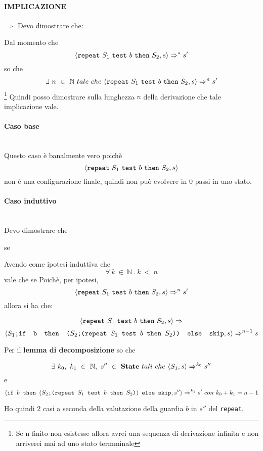 {	\paragraph{IMPLICAZIONE} \textbf{\Large{$\Longrightarrow$ }} 
	Devo dimostrare che:
	\begin{center}
	\exThreeLtR{}
	\end{center}
	
	Dal momento che 
	\[ \langle{}\texttt{repeat}~S_1~\texttt{test}~b~\texttt{then}~S_2, s\rangle{}\Rightarrow^{*}s' \]
	 so che
	\[ \exists{}~n~\in~\mathbb{N}~tale~che~
	\langle{}\texttt{repeat}~S_1~\texttt{test}~b~\texttt{then}~S_2, s\rangle{}\Rightarrow^{n}s' \]\footnote{Se n finito non esistesse allora avrei una sequenza di derivazione infinita e non arriverei mai ad uno stato termminale }
	Quindi posso dimostrare sulla
	lunghezza $n$ della derivazione che tale implicazione vale.\\
	\paragraph{Caso base}
	
	 \\
	Questo caso è banalmente vero poichè 
\[ \langle{}\texttt{repeat}~S_1~\texttt{test}~b~\texttt{then}~S_2, s\rangle{} \]
	non è una configurazione finale,
	quindi non può evolvere in 0 passi in uno stato.
	
	\paragraph{Caso induttivo} 
	
	 \\
	 Devo dimostrare che 
	\begin{center}
	se 
	\end{center}
	Avendo come ipotesi induttiva che 
	\[ \forall{}~k~\in~\mathbb{N}~.~k~<~n  \]vale che se 
	Poichè, per ipotesi, \[ \langle{}\texttt{repeat}~S_1~\texttt{test}~b~\texttt{then}~S_2, s\rangle{}\Rightarrow^{n}s' \] allora
	si ha che:

\[ 	\langle{}\texttt{repeat}~S_1~\texttt{test}~b~\texttt{then}~S_2, s\rangle{}\Rightarrow^{}   \]
\[	\langle{}\textrm{\normalfont{\texttt{$S_1$;\mbox{\normalfont{\texttt{if }}} b \textrm{\normalfont{\texttt{ then }}} (\textrm{\normalfont{\texttt{$S_2$;(\texttt{repeat}~$S_1$~\texttt{test}~$b$~\texttt{then}~$S_2$)}}}) \textrm{\normalfont{\texttt{ else }}} \textrm{\normalfont{\texttt{skip}}}}}}, s\rangle{}\Rightarrow^{n-1}s \]

	Per il \textbf{lemma di decomposizione} so che 

\[ 	\exists{}~k_0,~k_1~\in~
	\mathbb{N},~s''~\in~\mbox{\textbf{State}}{}~tali~che~\langle{}S_1, s\rangle{}\Rightarrow^{k_0}s'' \] e 
\[ 	\langle{}\mbox{\normalfont{\texttt{if }}} b \textrm{\normalfont{\texttt{ then }}} (\textrm{\normalfont{\texttt{$S_2$;(\texttt{repeat}~$S_1$~\texttt{test}~$b$~\texttt{then}~$S_2$)}}}) \textrm{\normalfont{\texttt{ else }}} \textrm{\normalfont{\texttt{skip}}}, s''\rangle{}\Rightarrow^{k_1}s'~con~k_0+k_1=n-1 \]

	Ho quindi 2 casi a seconda della valutazione della guardia $b$ in $s''$ del
	\texttt{repeat}.
	
}
